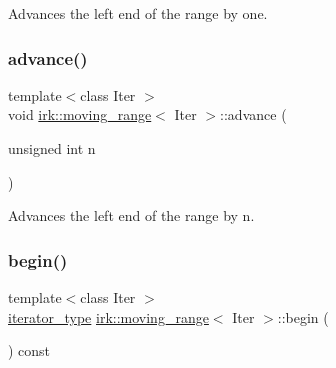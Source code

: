 Advances the left end of the range by one. 

\mbox{\label{structirk_1_1moving__range_ab184b9ac91013a6de5b31abef0498371}} 
\subsubsection{\texorpdfstring{advance()}{advance()}\hspace{0.1cm}{\footnotesize\ttfamily [2/2]}}
{\footnotesize\ttfamily template$<$class Iter $>$ \\
void \mbox{\hyperlink{structirk_1_1moving__range}{irk\+::moving\+\_\+range}}$<$ Iter $>$\+::advance (\begin{DoxyParamCaption}\item[{unsigned int}]{n }\end{DoxyParamCaption})\hspace{0.3cm}{\ttfamily [inline]}}



Advances the left end of the range by {\ttfamily n}. 

\mbox{\label{structirk_1_1moving__range_ac24e6010803fdad694992f2a677dfdbb}} 
\subsubsection{\texorpdfstring{begin()}{begin()}}
{\footnotesize\ttfamily template$<$class Iter $>$ \\
\mbox{\hyperlink{structirk_1_1moving__range_ad77e99c581516edfaae4cdb3cc6793ba}{iterator\+\_\+type}} \mbox{\hyperlink{structirk_1_1moving__range}{irk\+::moving\+\_\+range}}$<$ Iter $>$\+::begin (\begin{DoxyParamCaption}{ }\end{DoxyParamCaption}) const\hspace{0.3cm}{\ttfamily [inline]}}

\mbox{\label{structirk_1_1moving__range_ae3f8227591a53d22d087d8633ce3172f}} 
